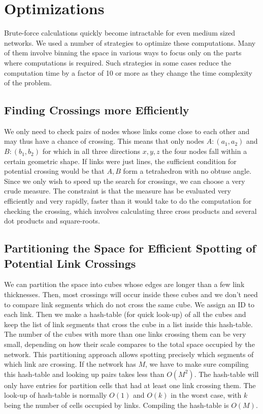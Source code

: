 \documentclass[endfloats,nofootinbib,preprint,floatfix,titlepage,superscriptaddress]{revtex4} %
\begin{document}
\section{Optimizations}
Brute-force calculations quickly become intractable for even medium sized networks. We used a number of strategies to optimize these computations. Many of them involve binning the space in various ways to focus only on the parts where computations is required. Such strategies in some cases reduce the computation time by a factor of 10 or more as they change the time complexity of the problem. 

\subsection{Finding Crossings more Efficiently}
We only need to check pairs of nodes whose links come close to each other and may thus have a chance of crossing. 
This means that only nodes $A:(a_1,a_2)$ and $B:(b_1,b_2)$ for which in all three  directions $x,y,z$ the four nodes fall within a certain geometric shape. 
If links were just lines, the sufficient condition for potential crossing would be that $A,B$ form a tetrahedron with no obtuse angle. 
Since we only wish to speed up the search for crossings, we can choose a very crude measure. 
The constraint is that the measure has be evaluated very efficiently and very rapidly, faster than it would take to do the computation for checking the crossing, which involves calculating three cross products and several dot products and square-roots. 

\subsection{ Partitioning the Space for Efficient Spotting of Potential Link Crossings}
We can partition the space into cubes whose edges are longer than a few link thicknesses. 
Then, most crossings will occur inside these cubes and we don't need to compare link segments which do not cross the same cube. 
We assign an ID to each link. 
Then we make a hash-table (for quick look-up) of all the cubes and keep the list of link segments that cross the cube in a list inside this hash-table. %
The number of the cubes with more than one links crossing them can be very small, depending on how their scale compares to the total space occupied by the network. 
This partitioning approach allows spotting precisely which segments of which link are crossing. 
If the network has $M$, we have to make sure compiling this hash-table and looking up pairs takes less than $O(M^2)$. 
The hash-table will only have entries for partition cells that had at least one link crossing them. 
The look-up of hash-table is normally $O(1)$ and $O(k)$ in the worst case, with $k$ being the number of cells occupied by links.  
Compiling the hash-table is $O(M)$. 
\end{document}
